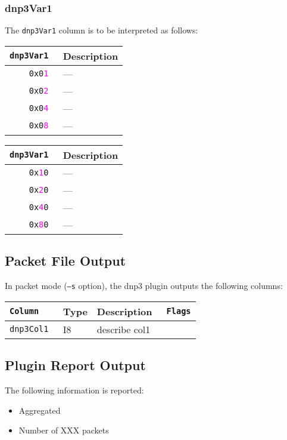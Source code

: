\documentclass[documentation]{subfiles}
\begin{document}
\subsubsection{dnp3Var1}\label{dnp3Var1}
The {\tt dnp3Var1} column is to be interpreted as follows:\\
\begin{minipage}{.48\textwidth}
    \begin{longtable}{>{\tt}rl}
        \toprule
        {\bf dnp3Var1} & {\bf Description}\\
        \midrule\endhead%
        0x0\textcolor{magenta}{1} & ---\\
        0x0\textcolor{magenta}{2} & ---\\
        0x0\textcolor{magenta}{4} & ---\\
        0x0\textcolor{magenta}{8} & ---\\
        \bottomrule
    \end{longtable}
\end{minipage}
\hfill
\begin{minipage}{.48\textwidth}
    \begin{longtable}{>{\tt}rl}
        \toprule
        {\bf dnp3Var1} & {\bf Description}\\
        \midrule\endhead%
        0x\textcolor{magenta}{1}0 & ---\\
        0x\textcolor{magenta}{2}0 & ---\\
        0x\textcolor{magenta}{4}0 & ---\\
        0x\textcolor{magenta}{8}0 & ---\\
        \bottomrule
    \end{longtable}
\end{minipage}

\subsection{Packet File Output}
In packet mode ({\tt --s} option), the dnp3 plugin outputs the following columns:
\begin{longtable}{>{\tt}lll>{\tt\small}l}
    \toprule
    {\bf Column} & {\bf Type} & {\bf Description} & {\bf Flags}\\
    \midrule\endhead%
    dnp3Col1 & I8 & describe col1 & \\
    \bottomrule
\end{longtable}

\subsection{Plugin Report Output}
The following information is reported:
\begin{itemize}
    \item Aggregated {\tt{}}
    \item Number of XXX packets
\end{itemize}
\end{document}
